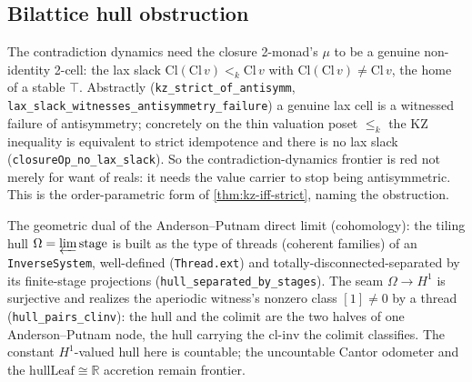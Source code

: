 \subsection{Bilattice hull obstruction}

\begin{theorem}\label{thm:lax-slack-is-antisymmetry}\leanok{}
The contradiction dynamics need the closure 2-monad's $\mu$ to be a genuine
non-identity 2-cell: the lax slack
$\mathrm{Cl}(\mathrm{Cl}\,v) <_k \mathrm{Cl}\,v$ with
$\mathrm{Cl}(\mathrm{Cl}\,v)\neq\mathrm{Cl}\,v$, the home of a stable $\top$.
Abstractly (\texttt{kz\_strict\_of\_antisymm},
\texttt{lax\_slack\_witnesses\_antisymmetry\_failure}) a genuine lax cell is a
witnessed failure of antisymmetry; concretely on the thin valuation poset
$\le_k$ the KZ inequality is equivalent to strict idempotence and there is no
lax slack (\texttt{closureOp\_no\_lax\_slack}). So the
contradiction-dynamics frontier is red not merely for want of reals: it needs
the value carrier to stop being antisymmetric. This is the order-parametric
form of \cref{thm:kz-iff-strict}, naming the obstruction.
\end{theorem}

\begin{theorem}\label{thm:inverse-hull-pairs-clinv}\leanok{}
The geometric dual of the Anderson--Putnam direct limit (cohomology): the
tiling hull $\Omega = \varprojlim \mathrm{stage}$ is built as the type of
threads (coherent families) of an \texttt{InverseSystem}, well-defined
(\texttt{Thread.ext}) and totally-disconnected-separated by its finite-stage
projections (\texttt{hull\_separated\_by\_stages}). The seam
$\Omega \to H^1$ is surjective and realizes the aperiodic witness's nonzero
class $[1]\neq0$ by a thread (\texttt{hull\_pairs\_clinv}): the hull and the
colimit are the two halves of one Anderson--Putnam node, the hull carrying the
$\mathrm{cl\text{-}inv}$ the colimit classifies. The constant $H^1$-valued
hull here is countable; the uncountable Cantor odometer and the
$\mathrm{hullLeaf}\cong\mathbb R$ accretion remain frontier.
\end{theorem}

